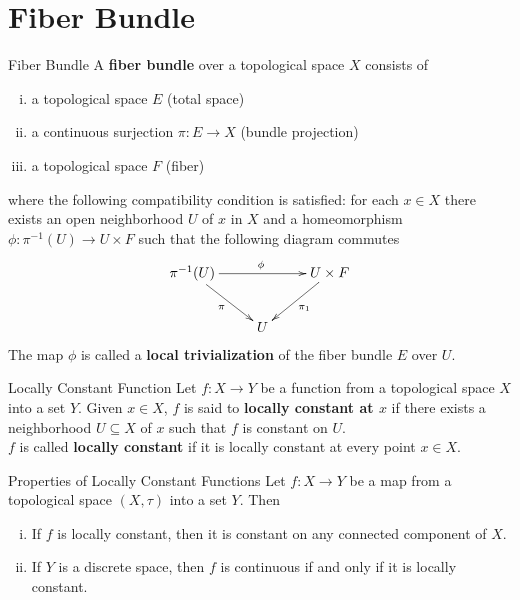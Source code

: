 \documentclass{report}
\begin{document}
\section{Fiber Bundle}
\begin{definition}{Fiber Bundle}{}
	A \textbf{fiber bundle} over a topological space $X$ consists of
	\begin{enumerate}[(i)]
		\item a topological space $E$ (total space)
		\item a continuous surjection $\pi:E\to X$ (bundle projection)
		\item a topological space $F$ (fiber)
	\end{enumerate}
	where the following compatibility condition is satisfied: for each $x\in X$ there exists an open neighborhood $U$ of $x$ in $X$ and a homeomorphism $\phi:\pi^{-1}(U)\to U\times F$ such that
	the following diagram commutes
	\[\xymatrix{
			\pi^{-1}(U)\ar[rd]_{\pi}\ar[rr]^{\phi}  & &U\times F\ar[ld]^{\pi_1}\\
			&U&
		}\]
	The map $\phi$ is called a \textbf{local trivialization} of the fiber bundle $E$ over $U$.
\end{definition}

\begin{definition}{Locally Constant Function}{}
	Let $f: X \to Y$ be a function from a topological space $X$ into a set $Y$. Given $x \in X$, $f$ is said to \textbf{locally constant at $x$} if there exists a neighborhood $U \subseteq X$ of $x$ such that $f$ is constant on $U$.\\
	$f$ is called \textbf{locally constant} if it is locally constant at every point $x \in X$.
\end{definition}

\begin{proposition}{Properties of Locally Constant Functions}{}
	Let $f: X \to Y$ be a map from a topological space $(X,\tau)$ into a set $Y$. Then
	\begin{enumerate}[(i)]
		\item If $f$ is locally constant, then it is constant on any connected component of $X$.
		\item If $Y$ is a discrete space, then $f$ is continuous if and only if it is locally constant.
	\end{enumerate}
\end{proposition}
\end{document}
